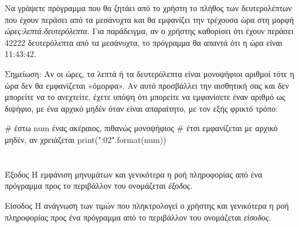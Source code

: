 \documentclass[a4paper,11pt,oneside]{book}
\begin{document}
\begin{exercise}
\marginnote[18pt]{
}Να γράψετε πρόγραμμα που θα ζητάει από το χρήστη το πλήθος των δευτερολέπτων που έχουν περάσει από τα μεσάνυχτα και θα εμφανίζει την τρέχουσα ώρα στη μορφή \emph{ώρες:λεπτά:δευτερόλεπτα}. Για παράδειγμα, αν ο χρήστης καθορίσει ότι έχουν περάσει 42222 δευτερόλεπτα από τα μεσάνυχτα, το πρόγραμμα θα απαντά ότι η ώρα είναι 11:43:42.

\begin{note}
Σημείωση: Αν οι ώρες, τα λεπτά ή τα δευτερόλεπτα είναι μονοψήφιοι αριθμοί τότε η ώρα δεν θα εμφανίζεται «όμορφα». Αν αυτό προσβάλλει την αισθητική σας και δεν μπορείτε να το ανεχτείτε, έχετε υπόψη ότι μπορείτε να εμφανίσετε έναν αριθμό ως διψήφιο, με ένα αρχικό μηδέν όταν είναι απαραίτητο, με τον εξής φρικτό τρόπο:

\begin{pycode}
# έστω num ένας ακέραιος, πιθανώς μονοψήφιος
# έτσι εμφανίζεται με αρχικό μηδέν, αν χρειάζεται
print("{:02}".format(num))
\end{pycode}
\end{note}

%
\end{exercise}


\section*{}
\vspace{2\parskip}
\hrulefill

\begin{theory}{Έξοδος}
Η εμφάνιση μηνυμάτων και γενικότερα η ροή πληροφορίας από ένα πρόγραμμα προς το περιβάλλον του ονομάζεται \emph{έξοδος}.

\end{theory}

\begin{theory}{Είσοδος}
Η ανάγνωση των τιμών που πληκτρολογεί ο χρήστης και γενικότερα η ροή πληροφορίας προς ένα πρόγραμμα από το περιβάλλον του ονομάζεται \emph{είσοδος}.
\end{theory}
\end{document}
